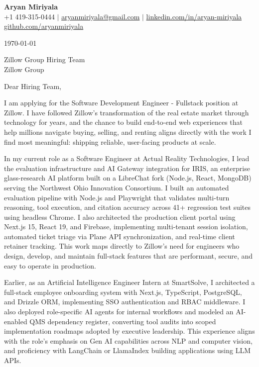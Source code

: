 \documentclass[letterpaper,11pt]{article}
\begin{document}
\begin{center}
  {\LARGE \textbf{Aryan Miriyala}}\\[2pt]
  \small
  +1 419-315-0444 $|$ \href{mailto:aryanmiriyala@gmail.com}{aryanmiriyala@gmail.com} $|$ \href{https://www.linkedin.com/in/aryan-miriyala-7788a21b6/}{linkedin.com/in/aryan-miriyala}\\
  \href{https://github.com/aryanmiriyala}{github.com/aryanmiriyala}
\end{center}\vspace{12pt}

\today

\vspace{12pt}

Zillow Group Hiring Team\\
Zillow Group

\vspace{12pt}

Dear Hiring Team,

I am applying for the Software Development Engineer - Fullstack position at Zillow. I have followed Zillow's transformation of the real estate market through technology for years, and the chance to build end-to-end web experiences that help millions navigate buying, selling, and renting aligns directly with the work I find most meaningful: shipping reliable, user-facing products at scale.

In my current role as a Software Engineer at Actual Reality Technologies, I lead the evaluation infrastructure and AI Gateway integration for IRIS, an enterprise glass-research AI platform built on a LibreChat fork (Node.js, React, MongoDB) serving the Northwest Ohio Innovation Consortium. I built an automated evaluation pipeline with Node.js and Playwright that validates multi-turn reasoning, tool execution, and citation accuracy across 41+ regression test suites using headless Chrome. I also architected the production client portal using Next.js 15, React 19, and Firebase, implementing multi-tenant session isolation, automated ticket triage via Plane API synchronization, and real-time client retainer tracking. This work maps directly to Zillow's need for engineers who design, develop, and maintain full-stack features that are performant, secure, and easy to operate in production.

Earlier, as an Artificial Intelligence Engineer Intern at SmartSolve, I architected a full-stack employee onboarding system with Next.js, TypeScript, PostgreSQL, and Drizzle ORM, implementing SSO authentication and RBAC middleware. I also deployed role-specific AI agents for internal workflows and modeled an AI-enabled QMS dependency register, converting tool audits into scoped implementation roadmaps adopted by executive leadership. This experience aligns with the role's emphasis on Gen AI capabilities across NLP and computer vision, and proficiency with LangChain or LlamaIndex building applications using LLM APIs.
\end{document}
